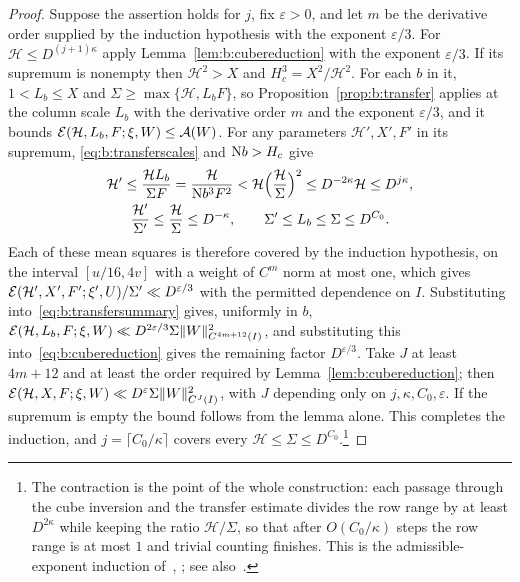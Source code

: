 \begin{proof}
Suppose the assertion holds for $j$, fix $\varepsilon>0$, and let $m$ be the derivative order supplied by the induction hypothesis with the exponent $\varepsilon/3$. For $\mathcal H\le D^{(j+1)\kappa}$ apply Lemma~\ref{lem:b:cubereduction} with the exponent $\varepsilon/3$. If its supremum is nonempty then $\mathcal H^2>X$ and $H_c^3=X^2/\mathcal H^2$. For each $b$ in it, $1<L_b\le X$ and $\Sigma\ge\max\{\mathcal H,L_bF\}$, so Proposition~\ref{prop:b:transfer} applies at the column scale $L_b$ with the derivative order $m$ and the exponent $\varepsilon/3$, and it bounds $\mathcal{E}(\mathcal H,L_b,F;\xi,W)\le\mathcal A(W)$. For any parameters $\mathcal H',X',F'$ in its supremum, \eqref{eq:b:transferscales} and $\mathrm{N} b>H_c$ give
\[
  \begin{gathered}
  \mathcal H'\le\frac{\mathcal HL_b}{\Sigma F}=\frac{\mathcal H}{\mathrm{N} b^3F^2}<\mathcal H\Bigl(\frac{\mathcal H}\Sigma\Bigr)^2\le D^{-2\kappa}\mathcal H\le D^{j\kappa},\\
  \frac{\mathcal H'}{\Sigma'}\le\frac{\mathcal H}\Sigma\le D^{-\kappa},\qquad\Sigma'\le L_b\le\Sigma\le D^{C_0}.
  \end{gathered}
\]
Each of these mean squares is therefore covered by the induction hypothesis, on the interval $[u/16,4v]$ with a weight of $C^m$ norm at most one, which gives $\mathcal{E}(\mathcal H',X',F';\xi',U)/\Sigma'\ll D^{\varepsilon/3}$ with the permitted dependence on $I$. Substituting into~\eqref{eq:b:transfersummary} gives, uniformly in $b$, $\mathcal{E}(\mathcal H,L_b,F;\xi,W)\ll D^{2\varepsilon/3}\Sigma\|W\|^2_{C^{4m+12}(I)}$, and substituting this into~\eqref{eq:b:cubereduction} gives the remaining factor $D^{\varepsilon/3}$. Take $J$ at least $4m+12$ and at least the order required by Lemma~\ref{lem:b:cubereduction}; then $\mathcal{E}(\mathcal H,X,F;\xi,W)\ll D^\varepsilon\Sigma\|W\|^2_{C^J(I)}$, with $J$ depending only on $j,\kappa,C_0,\varepsilon$. If the supremum is empty the bound follows from the lemma alone. This completes the induction, and $j=\lceil C_0/\kappa\rceil$ covers every $\mathcal H\le\Sigma\le D^{C_0}$.\footnote{The contraction is the point of the whole construction: each passage through the cube inversion and the transfer estimate divides the row range by at least $D^{2\kappa}$ while keeping the ratio $\mathcal H/\Sigma$, so that after $O(C_0/\kappa)$ steps the row range is at most $1$ and trivial counting finishes. This is the admissible-exponent induction of~\cite[Lemma~8 and \S8]{HB95}, \cite[Lemma~9]{HB00}; see also~\cite[Theorem~4.1]{GL}.}
\end{proof}

